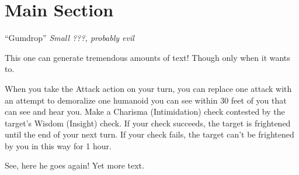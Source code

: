 

{\vspace{-3em}}

\section{Main Section}

\lipsum[1]

\newpage

\lipsum[1]

\newpage

\lipsum[1]

\newpage


\begin{monsterbox}{“Gumdrop”}
	\textit{Small ???, probably evil}\\
	\hline
	\basics[%
	armorclass = 13,
	hitpoints  = 33,
	speed      = 30 ft.
	]
	\hline
	\stats[
	STR = \stat{12}, %
	DEX = \stat{14},
	CON = \stat{10},
	INT = \stat{13},
	WIS = \stat{12},
	CHA = \stat{20}
	]
	\hline
	\details[%
	senses = {darkvision 60 ft., passive Perception 11},
	languages = {Common, Infernal, Sylvan, Draconic, Undercommon, Slaad, Spider (verbal and telepathic)},
	conditionimmunities = {charmed},
	]
	\begin{monsteraction}
		This one can generate tremendous amounts of text! Though only when it wants to.
	\end{monsteraction}
	\begin{monsteraction}
		When you take the Attack action on your turn, you can replace one attack with an attempt to demoralize one humanoid you can see within 30 feet of you that can see and hear you. Make a Charisma (Intimidation) check contested by the target's Wisdom (Insight) check. If your check succeeds, the target is frightened until the end of your next turn. If your check fails, the target can't be frightened by you in this way for 1 hour.
	\end{monsteraction}

	\begin{monsteraction}
	See, here he goes again! Yet more text.
	\end{monsteraction}
\end{monsterbox}

\clearpage
